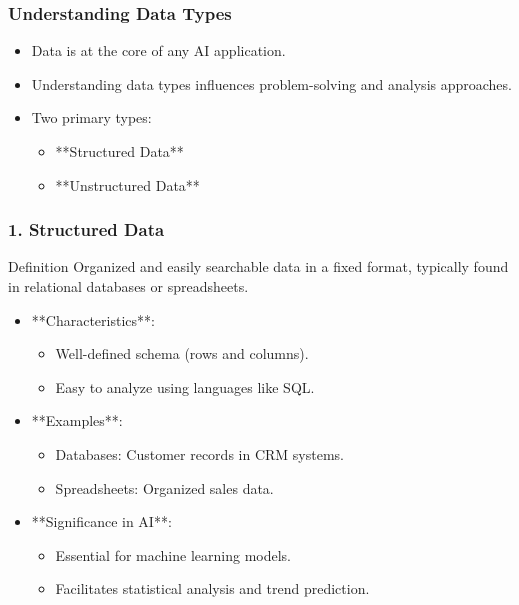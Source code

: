 \documentclass[aspectratio=169]{beamer}
\begin{document}
\begin{frame}[fragile]
    \frametitle{Understanding Data Types}
    \begin{itemize}
        \item Data is at the core of any AI application.
        \item Understanding data types influences problem-solving and analysis approaches.
        \item Two primary types: 
        \begin{itemize}
            \item **Structured Data**
            \item **Unstructured Data**
        \end{itemize}
    \end{itemize}
\end{frame}

\begin{frame}[fragile]
    \frametitle{1. Structured Data}
    \begin{block}{Definition}
        Organized and easily searchable data in a fixed format, typically found in relational databases or spreadsheets.
    \end{block}
    
    \begin{itemize}
        \item **Characteristics**:
        \begin{itemize}
            \item Well-defined schema (rows and columns).
            \item Easy to analyze using languages like SQL.
        \end{itemize}
        
        \item **Examples**:
        \begin{itemize}
            \item Databases: Customer records in CRM systems.
            \item Spreadsheets: Organized sales data.
        \end{itemize}
        
        \item **Significance in AI**:
        \begin{itemize}
            \item Essential for machine learning models.
            \item Facilitates statistical analysis and trend prediction.
        \end{itemize}
    \end{itemize}
\end{frame}
\end{document}
